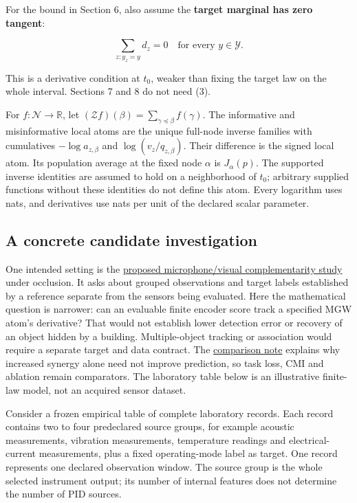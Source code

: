 \documentclass[11pt,a4paper]{article}
\begin{document}
For the bound in Section 6, also assume the \textbf{target marginal has zero tangent}:

\[
\sum_{z:y_z=y}d_z=0\quad\text{for every }y\in\mathcal Y. \tag{3}
\]

This is a derivative condition at \(t_0\), weaker than fixing the target law on the whole interval. Sections 7 and 8 do not need (3).

For \(f:\mathcal N\to\mathbb R\), let \((\mathcal Zf)(\beta)=\sum_{\gamma\preceq\beta}f(\gamma)\). The informative and misinformative local atoms are the unique full-node inverse families with cumulatives \(-\log a_{z,\beta}\) and \(\log(v_z/q_{z,\beta})\). Their difference is the signed local atom. Its population average at the fixed node \(\alpha\) is \(J_\alpha(p)\). The supported inverse identities are assumed to hold on a neighborhood of \(t_0\); arbitrary supplied functions without these identities do not define this atom. Every logarithm uses nats, and derivatives use nats per unit of the declared scalar parameter.

\subsection{A concrete candidate investigation}\label{a-concrete-candidate-investigation}

One intended setting is the \href{https://github.com/sepahead/pid-rs/blob/main/PID_SENSOR_PLACEMENT_AND_GALADRIEL_GUIDE.md\#9-ten-grounded-use-cases}{proposed microphone/visual complementarity study} under occlusion. It asks about grouped observations and target labels established by a reference separate from the sensors being evaluated. Here the mathematical question is narrower: can an evaluable finite encoder score track a specified MGW atom's derivative? That would not establish lower detection error or recovery of an object hidden by a building. Multiple-object tracking or association would require a separate target and data contract. The \href{https://github.com/sepahead/pid-rs/blob/main/PID_ALTERNATIVES_AND_INCREMENTAL_VALUE.md}{comparison note} explains why increased synergy alone need not improve prediction, so task loss, CMI and ablation remain comparators. The laboratory table below is an illustrative finite-law model, not an acquired sensor dataset.

Consider a frozen empirical table of complete laboratory records. Each record contains two to four predeclared source groups, for example acoustic measurements, vibration measurements, temperature readings and electrical-current measurements, plus a fixed operating-mode label as target. One record represents one declared observation window. The source group is the whole selected instrument output; its number of internal features does not determine the number of PID sources.
\end{document}
